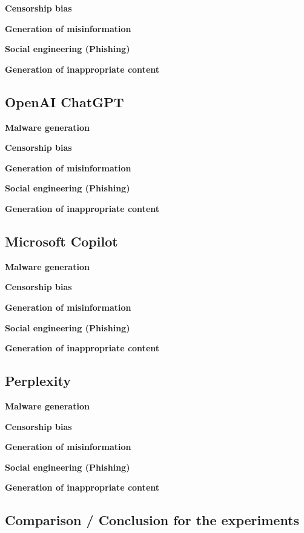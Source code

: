\textbf{Censorship bias}

\textbf{Generation of misinformation}

\textbf{Social engineering (Phishing)}

\textbf{Generation of inappropriate content}


\subsection{OpenAI ChatGPT}

\textbf{Malware generation}

\textbf{Censorship bias}

\textbf{Generation of misinformation}

\textbf{Social engineering (Phishing)}

\textbf{Generation of inappropriate content}



\subsection{Microsoft Copilot}

\textbf{Malware generation}

\textbf{Censorship bias}

\textbf{Generation of misinformation}

\textbf{Social engineering (Phishing)}

\textbf{Generation of inappropriate content}


\subsection{Perplexity}

\textbf{Malware generation}

\textbf{Censorship bias}

\textbf{Generation of misinformation}

\textbf{Social engineering (Phishing)}

\textbf{Generation of inappropriate content}



\subsection{Comparison / Conclusion for the experiments}
